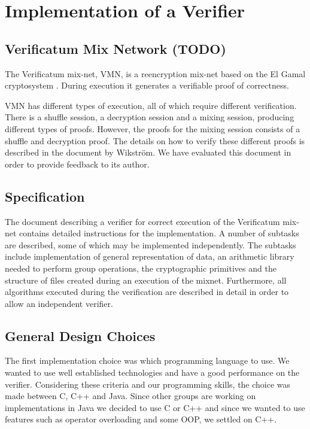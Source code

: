 \section{Implementation of a Verifier}

\subsection{Verificatum Mix Network (TODO)}

The Verificatum mix-net, VMN, is a reencryption mix-net based on the
El Gamal cryptosystem \cite[p.~1]{wikstrom1}. During execution it
generates a verifiable proof of correctness. 

VMN has different types of execution, all of which require different
verification. There is a shuffle session, a decryption session and a
mixing session, producing different types of proofs. However, the
proofs for the mixing session consists of a shuffle and decryption
proof. The details on how to verify these different proofs is
described in the document \cite{wikstrom1} by Wikström. We have
evaluated this document in order to provide feedback to its author.

\subsection{Specification}

The document \cite{wikstrom1} describing a verifier for correct
execution of the Verificatum mix-net contains detailed instructions
for the implementation. A number of subtasks are described, some of
which may be implemented independently. The subtasks include
implementation of general representation of data, an arithmetic
library needed to perform group operations, the cryptographic
primitives and the structure of files created during an execution of
the mixnet. Furthermore, all algorithms executed during the
verification are described in detail in order to allow an independent
verifier.

\subsection{General Design Choices}

The first implementation choice was which programming language to
use. We wanted to use well established technologies and have a good
performance on the verifier. Considering these criteria and our
programming skills, the choice was made between C, C++ and Java. Since
other groups are working on implementations in Java we decided to use
C or C++ and since we wanted to use features such as operator
overloading and some OOP, we settled on C++.

